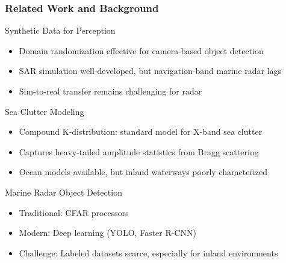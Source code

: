\documentclass[aspectratio=169, 10pt]{beamer}
\begin{document}
\begin{frame}
  \frametitle{Related Work and Background}
  \vspace{-0.2cm}

  \begin{block}{Synthetic Data for Perception}
    \footnotesize
    \setlength{\itemsep}{0pt}
    \begin{itemize}
      \item Domain randomization effective for camera-based object detection
      \item SAR simulation well-developed, but navigation-band marine radar lags
      \item Sim-to-real transfer remains challenging for radar
    \end{itemize}
  \end{block}
  \vspace{-0.1cm}

  \begin{block}{Sea Clutter Modeling}
    \footnotesize
    \setlength{\itemsep}{0pt}
    \begin{itemize}
      \item Compound K-distribution: standard model for X-band sea clutter
      \item Captures heavy-tailed amplitude statistics from Bragg scattering
      \item Ocean models available, but inland waterways poorly characterized
    \end{itemize}
  \end{block}
  \vspace{-0.1cm}

  \begin{block}{Marine Radar Object Detection}
    \footnotesize
    \setlength{\itemsep}{0pt}
    \begin{itemize}
      \item Traditional: CFAR processors
      \item Modern: Deep learning (YOLO, Faster R-CNN)
      \item Challenge: Labeled datasets scarce, especially for inland environments
    \end{itemize}
  \end{block}
\end{frame}
\end{document}

